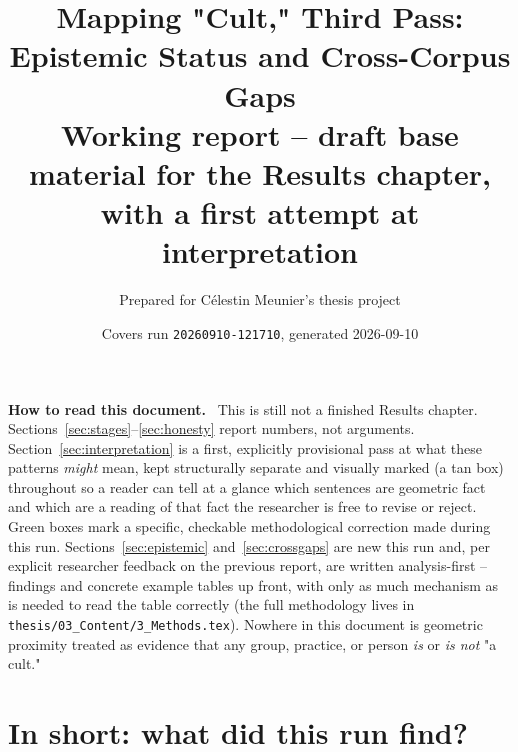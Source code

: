 \documentclass[11pt,a4paper]{article}
\title{\textbf{Mapping "Cult," Third Pass: Epistemic Status and Cross-Corpus Gaps}\\[4pt]
\large Working report -- draft base material for the Results chapter,\\
with a first attempt at interpretation}
\author{Prepared for C\'elestin Meunier's thesis project}
\date{Covers run \texttt{20260910-121710}, generated 2026-09-10}
\newenvironment{plainbox}[1][Note]
  {\par\vspace{6pt}\noindent{\color{noteline}\rule{\linewidth}{0.6pt}}\par\vspace{3pt}
   \noindent\small\textbf{#1.}\ \ignorespaces}
  {\par\vspace{3pt}\noindent{\color{noteline}\rule{\linewidth}{0.6pt}}\vspace{6pt}\par}
\begin{document}
\maketitle

\begin{plainbox}[How to read this document]
This is still not a finished Results chapter. Sections~\ref{sec:stages}--\ref{sec:honesty}
report numbers, not arguments. Section~\ref{sec:interpretation} is a first,
explicitly provisional pass at what these patterns \emph{might} mean, kept
structurally separate and visually marked (a tan box) throughout so a
reader can tell at a glance which sentences are geometric fact and which
are a reading of that fact the researcher is free to revise or reject.
Green boxes mark a specific, checkable methodological correction made
during this run. Sections~\ref{sec:epistemic} and~\ref{sec:crossgaps} are
new this run and, per explicit researcher feedback on the previous
report, are written analysis-first -- findings and concrete example
tables up front, with only as much mechanism as is needed to read the
table correctly (the full methodology lives in
\texttt{thesis/03\_Content/3\_Methods.tex}). Nowhere in this document is
geometric proximity treated as evidence that any group, practice, or
person \emph{is} or \emph{is not} "a cult."
\end{plainbox}

\tableofcontents

\section{In short: what did this run find?}
\label{sec:short}
\end{document}
